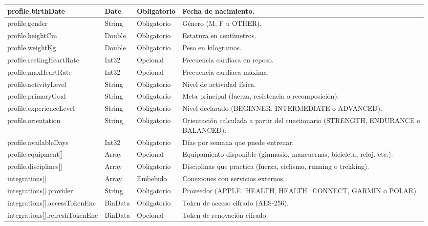 {\begin{longtable}{|>{\raggedright\arraybackslash}p{4.7cm}|>{\raggedright\arraybackslash}p{1.8cm}|>{\raggedright\arraybackslash}p{2.3cm}|>{\raggedright\arraybackslash}p{5.4cm}|}
    profile.\allowbreak birthDate & Date & Obligatorio & Fecha de nacimiento. \\ \hline
    profile.\allowbreak gender & String & Obligatorio & Género (M, F u OTHER). \\ \hline
    profile.\allowbreak heightCm & Double & Obligatorio & Estatura en centímetros. \\ \hline
    profile.\allowbreak weightKg & Double & Obligatorio & Peso en kilogramos. \\ \hline
    profile.\allowbreak restingHeartRate & Int32 & Opcional & Frecuencia cardíaca en reposo. \\ \hline
    profile.\allowbreak maxHeartRate & Int32 & Opcional & Frecuencia cardíaca máxima. \\ \hline
    profile.\allowbreak activityLevel & String & Obligatorio & Nivel de actividad física. \\ \hline
    profile.\allowbreak primaryGoal & String & Obligatorio & Meta principal (fuerza, resistencia o recomposición). \\ \hline
    profile.\allowbreak experienceLevel & String & Obligatorio & Nivel declarado (BEGINNER, INTERMEDIATE o ADVANCED). \\ \hline
    profile.\allowbreak orientation & String & Obligatorio & Orientación calculada a partir del cuestionario (STRENGTH, ENDURANCE o BALANCED). \\ \hline
    profile.\allowbreak availableDays & Int32 & Obligatorio & Días por semana que puede entrenar. \\ \hline
    profile.\allowbreak equipment[]\allowbreak  & Array & Opcional & Equipamiento disponible (gimnasio, mancuernas, bicicleta, reloj, etc.). \\ \hline
    profile.\allowbreak disciplines[]\allowbreak  & Array & Obligatorio & Disciplinas que practica (fuerza, ciclismo, running o trekking). \\ \hline
    integrations[]\allowbreak  & Array & Embebido & Conexiones con servicios externos. \\ \hline
    integrations[]\allowbreak .\allowbreak provider & String & Obligatorio & Proveedor (APPLE\_HEALTH, HEALTH\_CONNECT, GARMIN o POLAR). \\ \hline
    integrations[]\allowbreak .\allowbreak accessTokenEnc & BinData & Obligatorio & Token de acceso cifrado (AES-256). \\ \hline
    integrations[]\allowbreak .\allowbreak refreshTokenEnc & BinData & Opcional & Token de renovación cifrado. \\ \hline

\end{longtable}}
